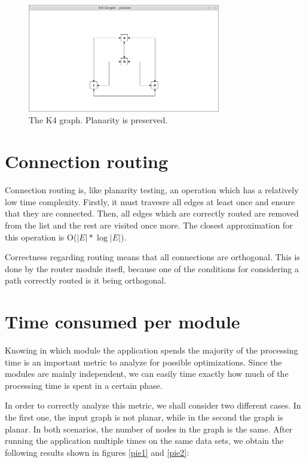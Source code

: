 \begin{figure}[ht] \centering
\includegraphics[width=0.75\textwidth]{img/results/k4graph.png}
\caption{The K4 graph. Planarity is preserved. \label{k4}} \end{figure}

\section{Connection routing}

Connection routing is, like planarity testing, an operation which has a relatively low time complexity.
Firstly, it must travesre all edges at least once and ensure that they are connected. Then, all edges which 
are correctly routed are removed from the list and the rest are visited once more. The closest approximation 
for this operation is O($|E| * \log |E|$).

Correctness regarding routing means that all connections are orthogonal. This is done by the router module 
itsefl, because one of the conditions for considering a path correctly routed is it being orthogonal.

\section{Time consumed per module}

Knowing in which module the application spends the majority of the processing time is an important metric 
to analyze for possible optimizations. Since the modules are mainly independent, we can easily time exactly 
how much of the processing time is spent in a certain phase. 

In order to correctly analyze this metric, we shall consider two different cases. In the first one, the input 
graph is not planar, while in the second the graph is planar. In both scenarios, the number of nodes in the 
graph is the same. After running the application multiple times on the same data sets, we obtain the 
following results shown in figures \ref{pie1} and \ref{pie2}: 

